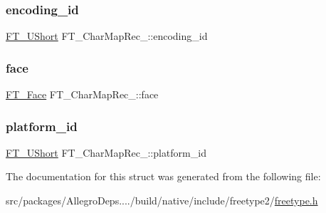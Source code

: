 \mbox{\label{struct_f_t___char_map_rec___af10dd43eee8dc93e7d6191c663ae831a}} 
\subsubsection{\texorpdfstring{encoding\+\_\+id}{encoding\_id}}
{\footnotesize\ttfamily \hyperlink{fttypes_8h_a937f6c17cf5ffd09086d8610c37b9f58}{F\+T\+\_\+\+U\+Short} F\+T\+\_\+\+Char\+Map\+Rec\+\_\+\+::encoding\+\_\+id}

\mbox{\label{struct_f_t___char_map_rec___a70a4e53e3f9818209916e5745c46dc28}} 
\subsubsection{\texorpdfstring{face}{face}}
{\footnotesize\ttfamily \hyperlink{freetype_8h_a7eba045ee20968354fa1bff0f69740fa}{F\+T\+\_\+\+Face} F\+T\+\_\+\+Char\+Map\+Rec\+\_\+\+::face}

\mbox{\label{struct_f_t___char_map_rec___ae7f439996a8615698e780ce3c4f92457}} 
\subsubsection{\texorpdfstring{platform\+\_\+id}{platform\_id}}
{\footnotesize\ttfamily \hyperlink{fttypes_8h_a937f6c17cf5ffd09086d8610c37b9f58}{F\+T\+\_\+\+U\+Short} F\+T\+\_\+\+Char\+Map\+Rec\+\_\+\+::platform\+\_\+id}



The documentation for this struct was generated from the following file\+:\begin{DoxyCompactItemize}
\item 
src/packages/\+Allegro\+Deps..../build/native/include/freetype2/\hyperlink{freetype_8h}{freetype.\+h}\end{DoxyCompactItemize}
